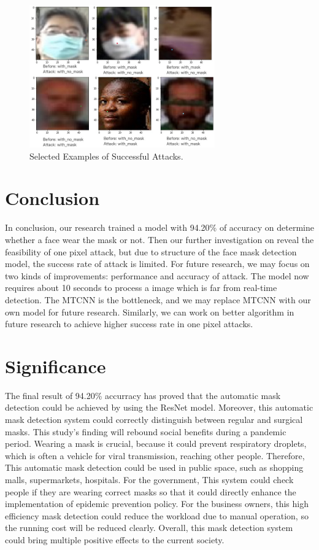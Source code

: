 \documentclass{article}
\begin{document}
\begin{figure}[h]
	\centering
    \includegraphics[width=8cm]{Slice.jpg}
    \caption{Selected Examples of Successful Attacks.}
\end{figure}

\section{Conclusion}
In conclusion, our research trained a model with 94.20\% of accuracy on determine whether a face wear the mask or not. Then our further investigation on reveal the feasibility of one pixel attack, but due to structure of the face mask detection model, the success rate of attack is limited. For future research, we may focus on two kinds of improvements: performance and accuracy of attack. The model now requires about 10 seconds to process a image which is far from real-time detection. The MTCNN is the bottleneck, and we may replace MTCNN with our own model for future research. Similarly, we can work on better algorithm in future research to achieve higher success rate in one pixel attacks.

\section{Significance}
The final result of 94.20\% accurracy has proved that the automatic mask detection could be achieved by using the ResNet model. Moreover, this automatic mask detection system could correctly distinguish between regular and surgical masks. This study's finding will rebound social benefits during a pandemic period. Wearing a mask is crucial, because it could prevent respiratory droplets, which is often a vehicle for viral transmission, reaching other people. Therefore, This automatic mask detection could be used in public space, such as shopping malls, supermarkets, hospitals. For the government, This system could check people if they are wearing correct masks so that it could directly enhance the implementation of epidemic prevention policy. For the business owners, this high efficiency mask detection could reduce the workload due to manual operation, so the running cost will be reduced clearly. Overall, this mask detection system could bring multiple positive effects to the current society. 
\end{document}
